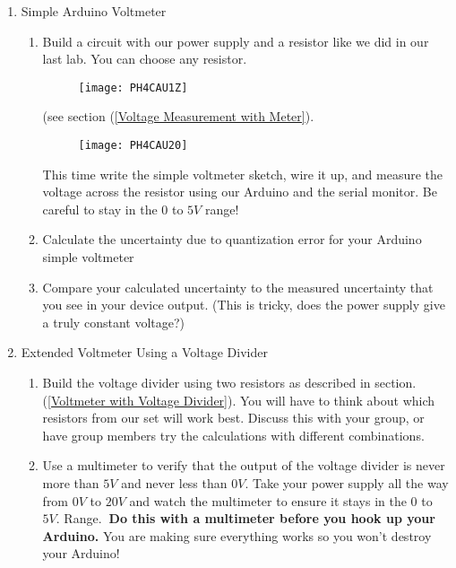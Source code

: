 \begin{enumerate}
	\item Simple Arduino Voltmeter

	\begin{enumerate}
		\item Build a circuit with our power supply and a resistor like we did in
			our last lab. You can choose any resistor. 
			\begin{figure}[h!]
				\centering
				\texttt{[image: PH4CAU1Z]}
			\end{figure}

			(see section (\ref{Voltage Measurement with Meter}). 
			\begin{figure}[h!]
				\centering
				\texttt{[image: PH4CAU20]}
			\end{figure}

			This time write the simple
			voltmeter sketch, wire it up, and measure the voltage across the resistor
			using our Arduino and the serial monitor. Be careful to stay in the $0$ to $5\unit{V}$ range!

		\item Calculate the uncertainty due to quantization error for your Arduino
			simple voltmeter

		\item Compare your calculated uncertainty to the measured uncertainty that
			you see in your device output. (This is tricky, does the power supply give a truly constant voltage?)
	\end{enumerate}

	\item Extended Voltmeter Using a Voltage Divider

		\begin{enumerate}
			\item Build the voltage divider using two resistors as described in 	section. (\ref{Voltmeter with Voltage Divider}). You will have to think about which resistors from our set will work best. Discuss this with your group, or have group members try the calculations with different combinations.

			\item Use a multimeter to verify that the output of the voltage divider is
			never more than $5\unit{V}$ and never less than $0\unit{V}.$ Take your power supply all the way from $0\unit{V}$ to $20\unit{V}$ and watch the multimeter to ensure it stays in the $0$ to $5\unit{V}.$ Range.\textbf{\ Do this with a multimeter before you hook up your Arduino.} You are making sure everything works so you won't destroy your Arduino!


\end{enumerate}
\end{enumerate}
